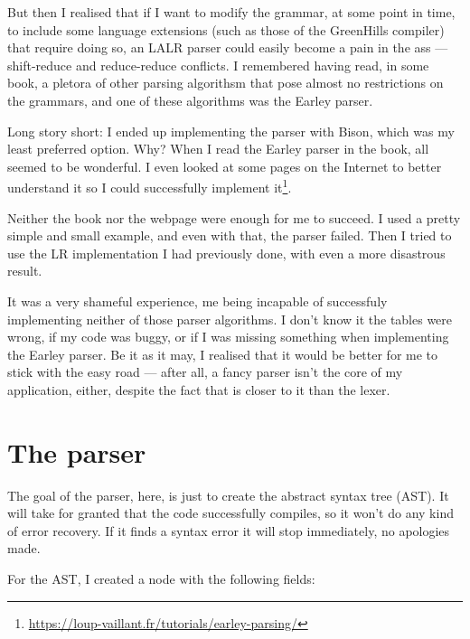 \documentclass[a4paper,openany]{refrep}
\begin{document}
But then I realised that if I want to modify the grammar, at some point in time, to include some language extensions (such as those of the GreenHills compiler) that require doing so, an LALR parser could easily become a pain in the ass --- shift-reduce and reduce-reduce conflicts. I remembered having read, in some book, a pletora of other parsing algorithsm that pose almost no restrictions on the grammars, and one of these algorithms was the Earley parser.

Long story short: I ended up implementing the parser with Bison, which was my least preferred option. Why? When I read the Earley parser in the book, all seemed to be wonderful. I even looked at some pages on the Internet to better understand it so I could successfully implement it\footnote{\url{https://loup-vaillant.fr/tutorials/earley-parsing/}}.

Neither the book nor the webpage were enough for me to succeed. I used a pretty simple and small example, and even with that, the parser failed. Then I tried to use the LR implementation I had previously done, with even a more disastrous result.

It was a very shameful experience, me being incapable of successfuly im\-ple\-men\-ting neither of those parser algorithms. I don't know it the tables were wrong, if my code was buggy, or if I was missing something when implementing the Earley parser. Be it as it may, I realised that it would be better for me to stick with the easy road --- after all, a fancy parser isn't the core of my application, either, despite the fact that is closer to it than the lexer.

\section{The parser}
The goal of the parser, here, is just to create the abstract syntax tree (AST). It will take for granted that the code successfully compiles, so it won't do any kind of error recovery. If it finds a syntax error it will stop immediately, no apologies made.

For the AST, I created a node with the following fields:
\end{document}
